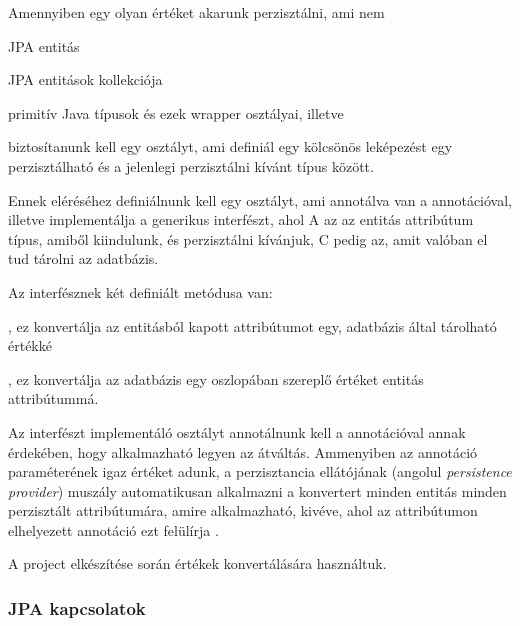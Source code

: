 Amennyiben egy olyan értéket akarunk perzisztálni, ami nem

\begin{listing}
	\item JPA entitás
	\item JPA entitások kollekciója
	\item primitív Java típusok és ezek wrapper osztályai, illetve 
\end{listing}

\noindent biztosítanunk kell egy osztályt, ami definiál egy kölcsönös leképezést egy perzisztálható és a jelenlegi perzisztálni kívánt típus között. \par

Ennek eléréséhez definiálnunk kell egy osztályt, ami annotálva van a  annotációval, illetve implementálja a  generikus interfészt, ahol A az az entitás attribútum típus, amiből kiindulunk, és perzisztálni kívánjuk, C pedig az, amit valóban el tud tárolni az adatbázis. \par

Az  interfésznek két definiált metódusa van:

\begin{listing}
	\item {}, ez konvertálja az entitásból kapott attribútumot egy, adatbázis által tárolható értékké
	\item {}, ez konvertálja az adatbázis egy oszlopában szereplő értéket entitás attribútummá.
\end{listing}

Az interfészt implementáló osztályt annotálnunk kell a  annotációval annak érdekében, hogy alkalmazható legyen az átváltás. Ammenyiben az annotáció  paraméterének igaz értéket adunk, a perzisztancia ellátójának (angolul \emph{persistence provider}) muszály automatikusan alkalmazni a konvertert minden entitás minden perzisztált attribútumára, amire alkalmazható, kivéve, ahol az attribútumon elhelyezett  annotáció ezt felülírja \cite{converterDocumentation}.

A project elkészítése során  értékek konvertálására használtuk.


\subsubsection{JPA kapcsolatok}

